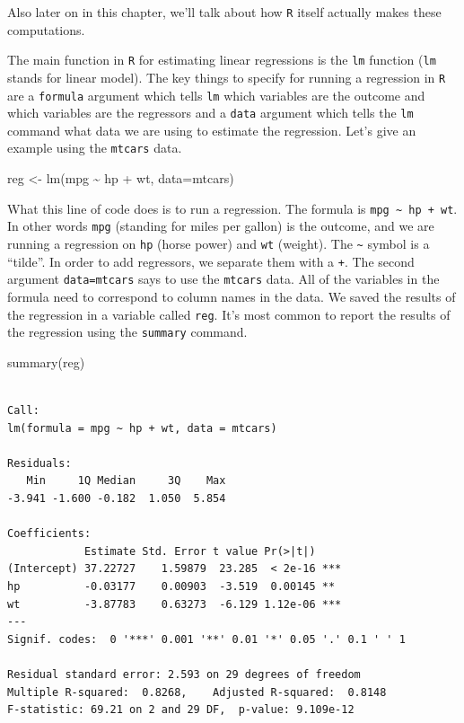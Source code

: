 \documentclass[
  letterpaper,
  DIV=11,
  numbers=noendperiod]{scrreprt}
\newenvironment{Shaded}{\begin{snugshade}}{\end{snugshade}}
\newcommand{\AttributeTok}[1]{\textcolor[rgb]{0.40,0.45,0.13}{#1}}
\newcommand{\FunctionTok}[1]{\textcolor[rgb]{0.28,0.35,0.67}{#1}}
\newcommand{\NormalTok}[1]{\textcolor[rgb]{0.00,0.23,0.31}{#1}}
\newcommand{\OtherTok}[1]{\textcolor[rgb]{0.00,0.23,0.31}{#1}}
\newcommand{\SpecialCharTok}[1]{\textcolor[rgb]{0.37,0.37,0.37}{#1}}
\begin{document}
Also later on in this chapter, we'll talk about how \texttt{R} itself
actually makes these computations.

The main function in \texttt{R} for estimating linear regressions is the
\texttt{lm} function (\texttt{lm} stands for linear model). The key
things to specify for running a regression in \texttt{R} are a
\texttt{formula} argument which tells \texttt{lm} which variables are
the outcome and which variables are the regressors and a \texttt{data}
argument which tells the \texttt{lm} command what data we are using to
estimate the regression. Let's give an example using the \texttt{mtcars}
data.

\begin{Shaded}
\begin{Highlighting}[]
\NormalTok{reg }\OtherTok{\textless{}{-}} \FunctionTok{lm}\NormalTok{(mpg }\SpecialCharTok{\textasciitilde{}}\NormalTok{ hp }\SpecialCharTok{+}\NormalTok{ wt, }\AttributeTok{data=}\NormalTok{mtcars)}
\end{Highlighting}
\end{Shaded}

What this line of code does is to run a regression. The formula is
\texttt{mpg\ \textasciitilde{}\ hp\ +\ wt}. In other words \texttt{mpg}
(standing for miles per gallon) is the outcome, and we are running a
regression on \texttt{hp} (horse power) and \texttt{wt} (weight). The
\texttt{\textasciitilde{}} symbol is a ``tilde''. In order to add
regressors, we separate them with a \texttt{+}. The second argument
\texttt{data=mtcars} says to use the \texttt{mtcars} data. All of the
variables in the formula need to correspond to column names in the data.
We saved the results of the regression in a variable called
\texttt{reg}. It's most common to report the results of the regression
using the \texttt{summary} command.

\begin{Shaded}
\begin{Highlighting}[]
\FunctionTok{summary}\NormalTok{(reg)}
\end{Highlighting}
\end{Shaded}

\begin{verbatim}

Call:
lm(formula = mpg ~ hp + wt, data = mtcars)

Residuals:
   Min     1Q Median     3Q    Max 
-3.941 -1.600 -0.182  1.050  5.854 

Coefficients:
            Estimate Std. Error t value Pr(>|t|)    
(Intercept) 37.22727    1.59879  23.285  < 2e-16 ***
hp          -0.03177    0.00903  -3.519  0.00145 ** 
wt          -3.87783    0.63273  -6.129 1.12e-06 ***
---
Signif. codes:  0 '***' 0.001 '**' 0.01 '*' 0.05 '.' 0.1 ' ' 1

Residual standard error: 2.593 on 29 degrees of freedom
Multiple R-squared:  0.8268,    Adjusted R-squared:  0.8148 
F-statistic: 69.21 on 2 and 29 DF,  p-value: 9.109e-12
\end{verbatim}
\end{document}
